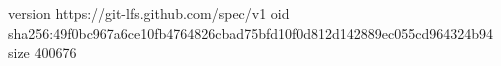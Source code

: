version https://git-lfs.github.com/spec/v1
oid sha256:49f0bc967a6ce10fb4764826cbad75bfd10f0d812d142889ec055cd964324b94
size 400676
